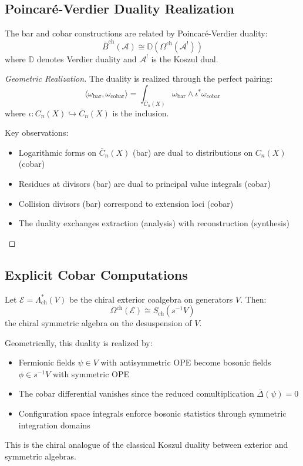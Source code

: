 \subsection{Poincaré-Verdier Duality Realization}

\begin{theorem}\label{thm:poincare-verdier}
The bar and cobar constructions are related by Poincaré-Verdier duality:
\[
\bar{B}^{\text{ch}}(\mathcal{A}) \cong \mathbb{D}(\Omega^{\text{ch}}(\mathcal{A}^!))
\]
where $\mathbb{D}$ denotes Verdier duality and $\mathcal{A}^!$ is the Koszul dual.
\end{theorem}

\begin{proof}[Geometric Realization]
The duality is realized through the perfect pairing:
\[
\langle \omega_{\text{bar}}, \omega_{\text{cobar}} \rangle = \int_{\overline{C}_n(X)} \omega_{\text{bar}} \wedge \iota^*\omega_{\text{cobar}}
\]
where $\iota: C_n(X) \hookrightarrow \overline{C}_n(X)$ is the inclusion.

Key observations:
\begin{itemize}
\item Logarithmic forms on $\overline{C}_n(X)$ (bar) are dual to distributions on $C_n(X)$ (cobar)
\item Residues at divisors (bar) are dual to principal value integrals (cobar)
\item Collision divisors (bar) correspond to extension loci (cobar)
\item The duality exchanges extraction (analysis) with reconstruction (synthesis)
\end{itemize}
\end{proof}

\subsection{Explicit Cobar Computations}

\begin{example}\label{ex:cobar-exterior}
Let $\mathcal{E} = \Lambda^*_{\text{ch}}(V)$ be the chiral exterior coalgebra on generators $V$. Then:
\[
\Omega^{\text{ch}}(\mathcal{E}) \cong S_{\text{ch}}(s^{-1}V)
\]
the chiral symmetric algebra on the desuspension of $V$. 

Geometrically, this duality is realized by:
\begin{itemize}
\item Fermionic fields $\psi \in V$ with antisymmetric OPE become bosonic fields $\phi \in s^{-1}V$ with symmetric OPE
\item The cobar differential vanishes since the reduced comultiplication $\bar{\Delta}(\psi) = 0$
\item Configuration space integrals enforce bosonic statistics through symmetric integration domains
\end{itemize}

This is the chiral analogue of the classical Koszul duality between exterior and symmetric algebras.
\end{example}


